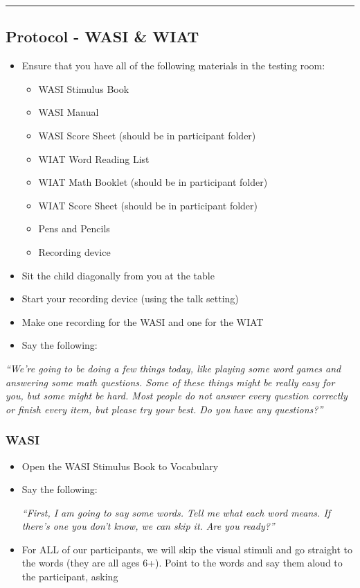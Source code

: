 \documentclass[]{book}
\providecommand{\tightlist}{%
  \setlength{\itemsep}{0pt}\setlength{\parskip}{0pt}}
\begin{document}
\begin{center}\rule{0.5\linewidth}{0.5pt}\end{center}

\hypertarget{protocol---wasi-wiat}{%
\subsection{Protocol - WASI \& WIAT}\label{protocol---wasi-wiat}}

\begin{itemize}
\tightlist
\item
  Ensure that you have all of the following materials in the testing room:

  \begin{itemize}
  \tightlist
  \item
    WASI Stimulus Book
  \item
    WASI Manual
  \item
    WASI Score Sheet (should be in participant folder)
  \item
    WIAT Word Reading List
  \item
    WIAT Math Booklet (should be in participant folder)
  \item
    WIAT Score Sheet (should be in participant folder)
  \item
    Pens and Pencils
  \item
    Recording device
  \end{itemize}
\item
  Sit the child diagonally from you at the table
\item
  Start your recording device (using the talk setting)
\item
  Make one recording for the WASI and one for the WIAT
\item
  Say the following:
\end{itemize}

\emph{``We're going to be doing a few things today, like playing some word games and answering some math questions. Some of these things might be really easy for you, but some might be hard. Most people do not answer every question correctly or finish every item, but please try your best. Do you have any questions?''}

\hypertarget{wasi-1}{%
\subsubsection{WASI}\label{wasi-1}}

\begin{itemize}
\item
  Open the WASI Stimulus Book to Vocabulary
\item
  Say the following:

  \emph{``First, I am going to say some words. Tell me what each word means.
  If there's one you don't know, we can skip it. Are you ready?''}
\item
  For ALL of our participants, we will skip the visual stimuli and go straight to the words (they are all ages 6+). Point to the words and say them aloud to the participant, asking
\end{itemize}
\end{document}
